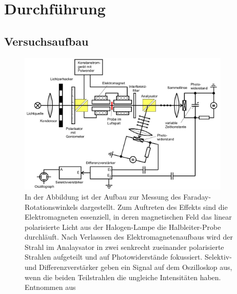 \newpage
\section{Durchführung}
    \subsection{Versuchsaufbau}

        \FloatBarrier

        \begin{figure}[h]
          \centering
          \includegraphics[width = 0.9\textwidth]{pictures/Aufbau.jpg}
          \caption{In der Abbildung ist der Aufbau zur Messung des Faraday-Rotationswinkels dargestellt. Zum Auftreten des Effekts sind die Elektromagneten essenziell, in deren magnetischen Feld das linear polarisierte Licht aus der Halogen-Lampe die Halbleiter-Probe durchläuft. Nach Verlasssen des Elektromagnetenaufbaus wird der Strahl im Analaysator in zwei senkrecht zueinander polarisierte Strahlen  aufgeteilt und auf Photowiderstände fokussiert. Selektiv- und Differenzverstärker geben ein Signal auf dem Oszilloskop aus, wenn die beiden Teilstrahlen die ungleiche Intensitäten haben. Entnommen aus~\cite{tu_dortmund_versuchsanleitung_2021-2}}
          \label{fig:Aufbau}
        \end{figure}

        \FloatBarrier

